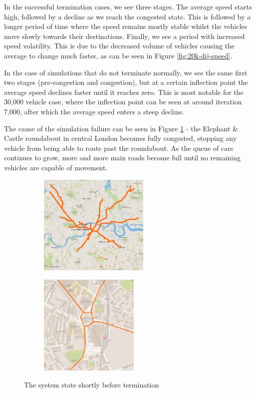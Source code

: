 \documentclass[ %
                    author={Alexander Hill},
                supervisor={Dr. Benjamin Sach},
                    degree={MEng},
                     title={MARMOSET},
                  subtitle={Multi-Agent Route Management using Online Simulation for Efficient Transportation},
                      type={research},
                      year={2016} ]{dissertation}
\begin{document}
In the successful termination cases, we see three stages. The average speed
starts high, followed by a decline as we reach the congested state. This is
followed by a longer period of time where the speed remains mostly stable whilst
the vehicles move slowly towards their destinations. Finally, we see a period
with increased speed volatility.  This is due to the decreased volume of
vehicles causing the average to change much faster, as can be seen in Figure
\ref{fig:20k-dij-speed}.

In the case of simulations that do not terminate normally, we see the same first
two stages (pre-congestion and congestion), but at a certain
inflection point the average speed declines faster until it reaches zero. This
is most notable for the 30,000 vehicle case, where the inflection point can be
seen at around iteration 7,000, after which the average speed enters a steep
decline.

The cause of the simulation failure can be seen in Figure \ref{fig:dijkstra-wtf}
- the Elephant \& Castle roundabout in central London becomes fully congested,
stopping any vehicle from being able to route past the roundabout. As the queue
of cars continues to grow, more and more main roads become full until no
remaining vehicles are capable of movement.

\begin{figure}[h]
\centering
\begin{subfigure}[b]{0.4\textwidth}
    \centering
    \includegraphics[height=13em]{dij-60k-blocked-wide}
\end{subfigure}
\hspace{1em}
\begin{subfigure}[b]{0.4\textwidth}
    \centering
    \includegraphics[height=13em]{dij-60k-blocked-close}
\end{subfigure}
\caption{The system state shortly before termination}\label{fig:dijkstra-wtf}
\end{figure}
\end{document}

